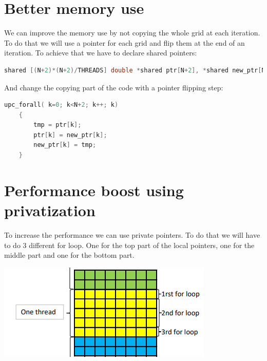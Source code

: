 \documentclass{report}
\begin{document}
\section{Better memory use}

We can improve the memory use by not copying the whole grid at each iteration. To do that we will use a pointer for each grid and flip them at the end of an iteration.\newline
To achieve that we have to declare shared pointers:
\begin{lstlisting}[language=c]
shared [(N+2)*(N+2)/THREADS] double *shared ptr[N+2], *shared new_ptr[N+2];
\end{lstlisting}
And change the copying part of the code with a pointer flipping step:

\begin{lstlisting}[language=c]
upc_forall( k=0; k<N+2; k++; k)
    {   
        tmp = ptr[k];
        ptr[k] = new_ptr[k];
        new_ptr[k] = tmp;
    }
\end{lstlisting}

\section{Performance boost using privatization}

To increase the performance we can use private pointers. To do that we will have to do 3 different for loop. One for the top part of the local pointers, one for the middle part and one for the bottom part.

\begin{center}
    \includegraphics[scale=1]{Images/for_loop_distribution.png}
    \label{fig6}
\end{center}
\end{document}
